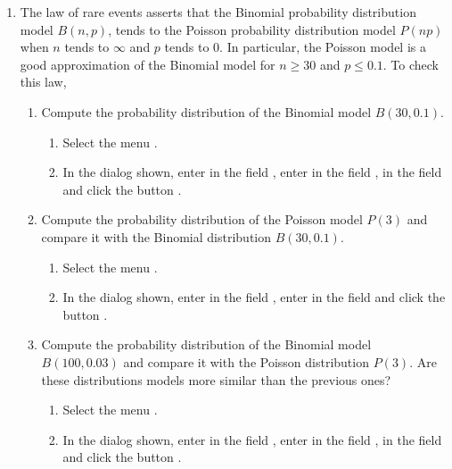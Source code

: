 \begin{enumerate}[leftmargin=*]
\item The law of rare events asserts that the Binomial probability distribution model $B(n,p)$, tends to the Poisson probability distribution model $P(np)$ when $n$ tends to $\infty$ and $p$ tends to $0$. 
In particular, the Poisson model is a good approximation of the Binomial model for $n\geq 30$ and $p\leq 0.1$.
To check this law, 
\begin{enumerate}
\item Compute the probability distribution of the Binomial model $B(30,0.1)$.
\begin{indication}
\begin{enumerate}
\item Select the menu .
\item In the dialog shown, enter  in the field , enter  in the field ,  in the field  and click the button .
\end{enumerate}
\end{indication}

\item Compute the probability distribution of the Poisson model $P(3)$ and compare it with the Binomial distribution $B(30,0.1)$.
\begin{indication}
\begin{enumerate}
\item Select the menu .
\item In the dialog shown, enter  in the field , enter  in the field  and click the button .
\end{enumerate}
\end{indication}

\item Compute the probability distribution of the Binomial model $B(100,0.03)$ and compare it with the Poisson distribution $P(3)$.
Are these distributions models more similar than the previous ones? 
\begin{indication}
\begin{enumerate}
\item Select the menu .
\item In the dialog shown, enter  in the field , enter  in the field ,  in the field  and click the button .
\end{enumerate}
\end{indication}


\end{enumerate}
\end{enumerate}

